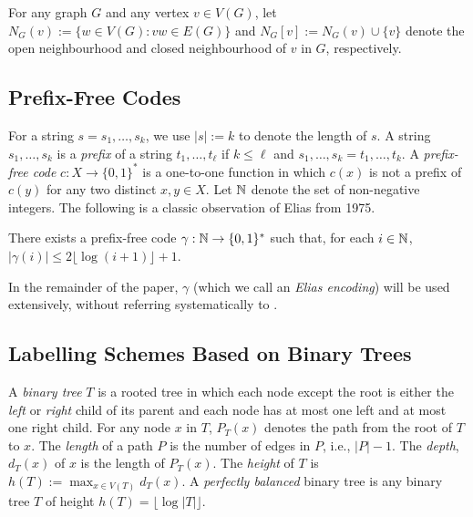 \documentclass[kpfonts]{patmorin}
\newcommand{\Oh}{\mathcal{O}}
\let\le\leqslant
\begin{document}
For any graph $G$ and any vertex $v\in V(G)$, let $N_G(v):=\{w\in V(G): vw\in E(G)\}$ and $N_G[v]:=N_G(v)\cup\{v\}$ denote the open neighbourhood and closed neighbourhood of $v$ in $G$, respectively.

\subsection{Prefix-Free Codes}

For a string $s=s_1,\ldots,s_k$, we use $|s|:=k$ to denote the length of $s$.
A string $s_1,\ldots,s_k$ is a \emph{prefix} of a string $t_1,\ldots,t_\ell$ if $k\le \ell$ and $s_1,\ldots,s_k=t_1,\ldots,t_k$.  A \emph{prefix-free code} $c:X\to\{0,1\}^*$ is a one-to-one function in which $c(x)$ is not a prefix of $c(y)$ for any two distinct $x,y\in X$.  Let $\mathbb{N}$ denote the set of non-negative integers.  The following is a classic observation of Elias from 1975.



\begin{lem}
    There exists a prefix-free code $\gamma:\mathbb{N}\to\{0,1\}^*$ such that, for each $i\in\mathbb{N}$, $|\gamma(i)|\le 2\lfloor\log(i+1)\rfloor + 1$.%
  \end{lem}

  In the remainder of the paper, $\gamma$ (which we call an \emph{Elias encoding}) will be used extensively, without referring systematically to .

\subsection{Labelling Schemes Based on Binary Trees}

A \emph{binary tree} $T$ is a rooted tree in which each node except the root is either the \emph{left} or \emph{right} child of its parent and each node has at most one left and at most one right child.  For any node $x$ in $T$, $P_T(x)$ denotes the path from the root of $T$ to $x$.  The \emph{length} of a path $P$ is the number of edges in $P$, i.e., $|P|-1$.  The \emph{depth}, $d_T(x)$ of $x$ is the length of $P_T(x)$.  The \emph{height} of $T$ is $h(T):=\max_{x\in V(T)} d_T(x)$.  A \emph{perfectly balanced} binary tree is any binary tree $T$ of height $h(T)=\lfloor\log|T|\rfloor$.
\end{document}
